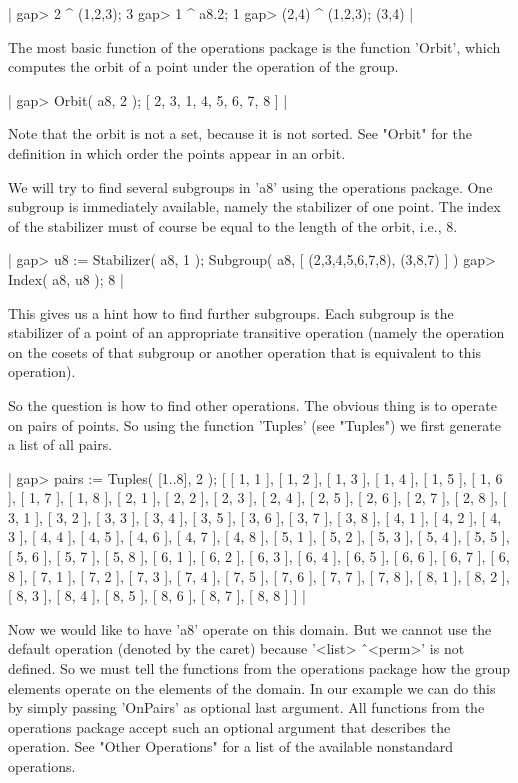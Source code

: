 |    gap> 2 ^ (1,2,3);
    3
    gap> 1 ^ a8.2;
    1
    gap> (2,4) ^ (1,2,3);
    (3,4) |

The most  basic  function  of  the  operations  package  is the  function
'Orbit', which computes  the  orbit of a point under the operation of the
group.

|    gap> Orbit( a8, 2 );
    [ 2, 3, 1, 4, 5, 6, 7, 8 ] |

Note  that the orbit is not a set, because it is not sorted.  See "Orbit"
for the definition in which order the points appear in an orbit.

We will  try to  find several  subgroups  in  'a8' using  the  operations
package.  One subgroup is immediately available, namely the stabilizer of
one  point.  The index  of the stabilizer must of  course be equal to the
length of the orbit, i.e., 8.

|    gap> u8 := Stabilizer( a8, 1 );
    Subgroup( a8, [ (2,3,4,5,6,7,8), (3,8,7) ] )
    gap> Index( a8, u8 );
    8 |

This gives us a hint how to find further subgroups.  Each subgroup is the
stabilizer of a point of an appropriate transitive operation  (namely the
operation on  the  cosets of that subgroup or  another  operation that is
equivalent to this operation).

So the question is how to find other operations.  The obvious thing is to
operate  on  pairs  of  points.   So  using  the  function 'Tuples'  (see
"Tuples") we first generate a list of all pairs.

|    gap> pairs := Tuples( [1..8], 2 );
    [ [ 1, 1 ], [ 1, 2 ], [ 1, 3 ], [ 1, 4 ], [ 1, 5 ], [ 1, 6 ],
      [ 1, 7 ], [ 1, 8 ], [ 2, 1 ], [ 2, 2 ], [ 2, 3 ], [ 2, 4 ],
      [ 2, 5 ], [ 2, 6 ], [ 2, 7 ], [ 2, 8 ], [ 3, 1 ], [ 3, 2 ],
      [ 3, 3 ], [ 3, 4 ], [ 3, 5 ], [ 3, 6 ], [ 3, 7 ], [ 3, 8 ],
      [ 4, 1 ], [ 4, 2 ], [ 4, 3 ], [ 4, 4 ], [ 4, 5 ], [ 4, 6 ],
      [ 4, 7 ], [ 4, 8 ], [ 5, 1 ], [ 5, 2 ], [ 5, 3 ], [ 5, 4 ],
      [ 5, 5 ], [ 5, 6 ], [ 5, 7 ], [ 5, 8 ], [ 6, 1 ], [ 6, 2 ],
      [ 6, 3 ], [ 6, 4 ], [ 6, 5 ], [ 6, 6 ], [ 6, 7 ], [ 6, 8 ],
      [ 7, 1 ], [ 7, 2 ], [ 7, 3 ], [ 7, 4 ], [ 7, 5 ], [ 7, 6 ],
      [ 7, 7 ], [ 7, 8 ], [ 8, 1 ], [ 8, 2 ], [ 8, 3 ], [ 8, 4 ],
      [ 8, 5 ], [ 8, 6 ], [ 8, 7 ], [ 8, 8 ] ] |

Now we would like to have 'a8' operate on this domain.  But we cannot use
the default operation (denoted by the caret) because '<list> \^\  <perm>'
is  not defined.  So we  must  tell the  functions  from  the  operations
package how the group elements operate on the elements of the domain.  In
our example we can do this by simply passing  'OnPairs' as  optional last
argument.  All functions from  the  operations  package  accept  such  an
optional  argument  that describes the operation.  See "Other Operations"
for a list of the available nonstandard operations.

